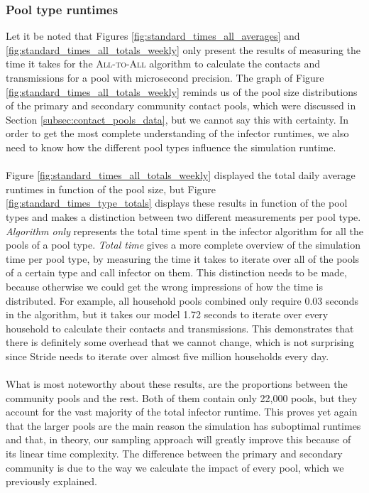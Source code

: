 \subsubsection{Pool type runtimes}
Let it be noted that Figures \ref{fig:standard_times_all_averages} and \ref{fig:standard_times_all_totals_weekly} only present the results of measuring the time it takes for the \textsc{All-to-All} algorithm to calculate the contacts and transmissions for a pool with microsecond precision. The graph of Figure \ref{fig:standard_times_all_totals_weekly} reminds us of the pool size distributions of the primary and secondary community contact pools, which were discussed in Section \ref{subsec:contact_pools_data}, but we cannot say this with certainty. In order to get the most complete understanding of the infector runtimes, we also need to know how the different pool types influence the simulation runtime.
\\\\
Figure \ref{fig:standard_times_all_totals_weekly} displayed the total daily average runtimes in function of the pool size, but Figure \ref{fig:standard_times_type_totals} displays these results in function of the pool types and makes a distinction between two different measurements per pool type. \textit{Algorithm only} represents the total time spent in the infector algorithm for all the pools of a pool type. \textit{Total time} gives a more complete overview of the simulation time per pool type, by measuring the time it takes to iterate over all of the pools of a certain type and call infector on them. This distinction needs to be made, because otherwise we could get the wrong impressions of how the time is distributed. For example, all household pools combined only require 0.03 seconds in the algorithm, but it takes our model 1.72 seconds to iterate over every household to calculate their contacts and transmissions. This demonstrates that there is definitely some overhead that we cannot change, which is not surprising since Stride needs to iterate over almost five million households every day.
\\\\
What is most noteworthy about these results, are the proportions between the community pools and the rest. Both of them contain only 22,000 pools, but they account for the vast majority of the total infector runtime. This proves yet again that the larger pools are the main reason the simulation has suboptimal runtimes and that, in theory, our sampling approach will greatly improve this because of its linear time complexity. The difference between the primary and secondary community is due to the way we calculate the impact of every pool, which we previously explained.

